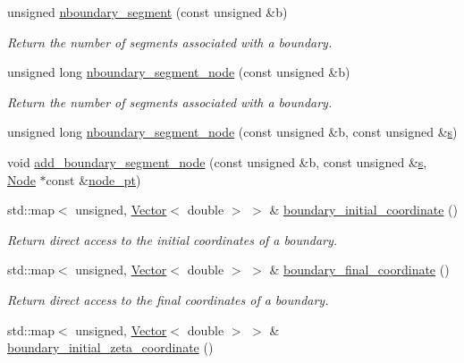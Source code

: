 \begin{DoxyCompactItemize}
unsigned \hyperlink{classoomph_1_1UnstructuredTwoDMeshGeometryBase_a5408ad4ce30e3c987c32dab46cdffba2}{nboundary\+\_\+segment} (const unsigned \&b)
\begin{DoxyCompactList}\small\item\em Return the number of segments associated with a boundary. \end{DoxyCompactList}\item 
unsigned long \hyperlink{classoomph_1_1UnstructuredTwoDMeshGeometryBase_a667c4dff46145685622836fc3b7af92d}{nboundary\+\_\+segment\+\_\+node} (const unsigned \&b)
\begin{DoxyCompactList}\small\item\em Return the number of segments associated with a boundary. \end{DoxyCompactList}\item 
unsigned long \hyperlink{classoomph_1_1UnstructuredTwoDMeshGeometryBase_af9b3b54526e72cc9a1909f141e8d5675}{nboundary\+\_\+segment\+\_\+node} (const unsigned \&b, const unsigned \&\hyperlink{cfortran_8h_ab7123126e4885ef647dd9c6e3807a21c}{s})
\item 
void \hyperlink{classoomph_1_1UnstructuredTwoDMeshGeometryBase_a967d6bf715fca6ed9d8cd9a38382990b}{add\+\_\+boundary\+\_\+segment\+\_\+node} (const unsigned \&b, const unsigned \&\hyperlink{cfortran_8h_ab7123126e4885ef647dd9c6e3807a21c}{s}, \hyperlink{classoomph_1_1Node}{Node} $\ast$const \&\hyperlink{classoomph_1_1Mesh_aebdb699466fe07f2e27aa4404008cde4}{node\+\_\+pt})
\item 
std\+::map$<$ unsigned, \hyperlink{classoomph_1_1Vector}{Vector}$<$ double $>$ $>$ \& \hyperlink{classoomph_1_1UnstructuredTwoDMeshGeometryBase_aecab296a3a2dc4b413458309748b6065}{boundary\+\_\+initial\+\_\+coordinate} ()
\begin{DoxyCompactList}\small\item\em Return direct access to the initial coordinates of a boundary. \end{DoxyCompactList}\item 
std\+::map$<$ unsigned, \hyperlink{classoomph_1_1Vector}{Vector}$<$ double $>$ $>$ \& \hyperlink{classoomph_1_1UnstructuredTwoDMeshGeometryBase_a20fb1983af13d17646e665bd0128d20c}{boundary\+\_\+final\+\_\+coordinate} ()
\begin{DoxyCompactList}\small\item\em Return direct access to the final coordinates of a boundary. \end{DoxyCompactList}\item 
std\+::map$<$ unsigned, \hyperlink{classoomph_1_1Vector}{Vector}$<$ double $>$ $>$ \& \hyperlink{classoomph_1_1UnstructuredTwoDMeshGeometryBase_a14a3519c23aff7de59569335e4103eaf}{boundary\+\_\+initial\+\_\+zeta\+\_\+coordinate} ()

\end{DoxyCompactItemize}
